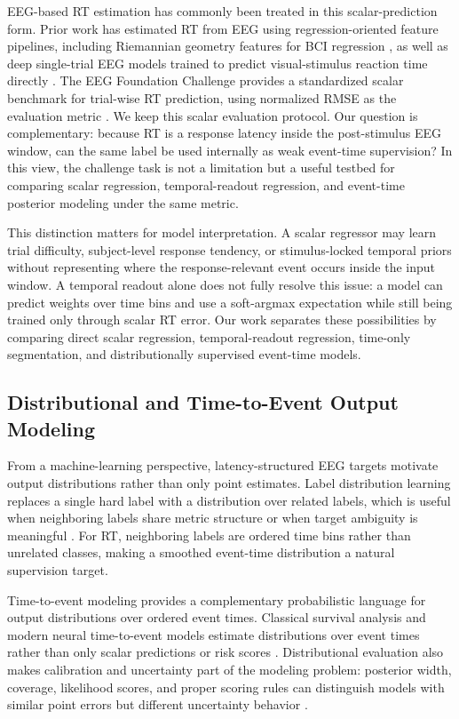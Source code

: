 \documentclass[12pt]{article}
\begin{document}
EEG-based RT estimation has commonly been treated in this scalar-prediction form. Prior work has estimated RT from EEG using regression-oriented feature pipelines, including Riemannian geometry features for BCI regression \citep{Wu2017RiemannianRT}, as well as deep single-trial EEG models trained to predict visual-stimulus reaction time directly \citep{Chowdhury2020RTSensors}. The EEG Foundation Challenge provides a standardized scalar benchmark for trial-wise RT prediction, using normalized RMSE as the evaluation metric \citep{EEGFoundationChallengeArxiv2025,EEGChallengeWebsite2025}. We keep this scalar evaluation protocol. Our question is complementary: because RT is a response latency inside the post-stimulus EEG window, can the same label be used internally as weak event-time supervision? In this view, the challenge task is not a limitation but a useful testbed for comparing scalar regression, temporal-readout regression, and event-time posterior modeling under the same metric.

This distinction matters for model interpretation. A scalar regressor may learn trial difficulty, subject-level response tendency, or stimulus-locked temporal priors without representing where the response-relevant event occurs inside the input window. A temporal readout alone does not fully resolve this issue: a model can predict weights over time bins and use a soft-argmax expectation while still being trained only through scalar RT error. Our work separates these possibilities by comparing direct scalar regression, temporal-readout regression, time-only segmentation, and distributionally supervised event-time models.

\subsection{Distributional and Time-to-Event Output Modeling}
From a machine-learning perspective, latency-structured EEG targets motivate output distributions rather than only point estimates. Label distribution learning replaces a single hard label with a distribution over related labels, which is useful when neighboring labels share metric structure or when target ambiguity is meaningful \citep{Geng2016LabelDistributionLearning}. For RT, neighboring labels are ordered time bins rather than unrelated classes, making a smoothed event-time distribution a natural supervision target.

Time-to-event modeling provides a complementary probabilistic language for output distributions over ordered event times. Classical survival analysis and modern neural time-to-event models estimate distributions over event times rather than only scalar predictions or risk scores \citep{Cox1972CoxPH,Lee2018DeepHit}. Distributional evaluation also makes calibration and uncertainty part of the modeling problem: posterior width, coverage, likelihood scores, and proper scoring rules can distinguish models with similar point errors but different uncertainty behavior \citep{Chapfuwa2023Calibration,Haider2020SurvivalDistributions}.
\end{document}
